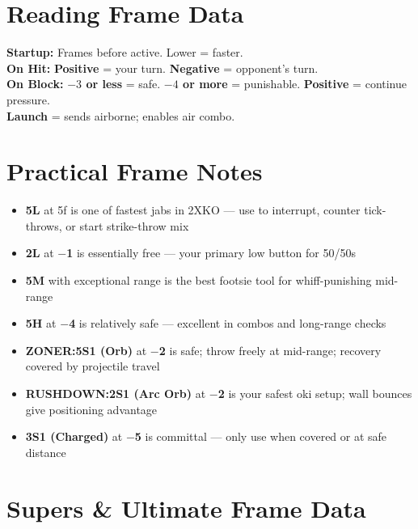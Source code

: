 \documentclass[12pt, a4paper]{report}
\newcommand{\movename}[1]{\textbf{\textcolor{ahriGold}{#1}}}
\newcommand{\advantage}[1]{\textcolor{ahriGreen}{\textbf{#1}}}
\newcommand{\disadvantage}[1]{\textcolor{ahriRed}{\textbf{#1}}}
\newcommand{\zoner}{\textcolor{ahriCyan}{\bfseries\sffamily{\small $\blacktriangleright$} ZONER:}\;}
\newcommand{\rushdown}{\textcolor{ahriMagenta}{\bfseries\sffamily{\small $\blacktriangleright$} RUSHDOWN:}\;}
\begin{document}
\section{Reading Frame Data}

\begin{tipbox}
\textbf{Startup:} Frames before active. Lower = faster.\\[0.3em]
\textbf{On Hit:} \advantage{Positive} = your turn. \disadvantage{Negative} = opponent's turn.\\[0.3em]
\textbf{On Block:} \disadvantage{$-3$ or less} = safe. \disadvantage{$-4$ or more} = punishable. \advantage{Positive} = continue pressure.\\[0.3em]
\textbf{Launch} = sends airborne; enables air combo.
\end{tipbox}

\section{Practical Frame Notes}

\begin{itemize}
  \item \movename{5L} at 5f is one of fastest jabs in 2XKO --- use to interrupt, counter tick-throws, or start strike-throw mix
  \item \movename{2L} at \disadvantage{$-$1} is essentially free --- your primary low button for 50/50s
  \item \movename{5M} with exceptional range is the best footsie tool for whiff-punishing mid-range
  \item \movename{5H} at \disadvantage{$-$4} is relatively safe --- excellent in combos and long-range checks
  \item \zoner \movename{5S1 (Orb)} at \disadvantage{$-$2} is safe; throw freely at mid-range; recovery covered by projectile travel
  \item \rushdown \movename{2S1 (Arc Orb)} at \disadvantage{$-$2} is your safest oki setup; wall bounces give positioning advantage
  \item \movename{3S1 (Charged)} at \disadvantage{$-$5} is committal --- only use when covered or at safe distance
\end{itemize}

\section{Supers \& Ultimate Frame Data}
\end{document}
